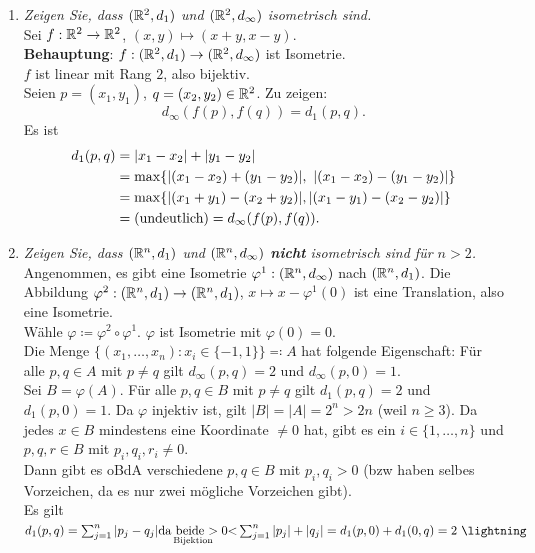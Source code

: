 \begin{problem*}[4]
  \begin{enumerate}
    \item \emph{Zeigen Sie, dass $ (\mathbb{R}^2, d_1) $ und $ (\mathbb{R}^2, d_\infty) $ isometrisch sind.} \\
      Sei $ f : \mathbb{R}^2 \to \mathbb{R}^2 $, $ (x,y) \mapsto (x+y, x-y) $. \\
      \textbf{Behauptung}: $ f : (\mathbb{R}^2, d_1) \to (\mathbb{R}^2, d_\infty) $ ist Isometrie. \\
      $ f $ ist linear mit Rang $ 2 $, also bijektiv. \\
      Seien $ p = (x_1, y_1) $, $ q = (x_2, y_2) \in \mathbb{R}^2 $. Zu zeigen:
      \begin{equation*}
        d_\infty(f(p),f(q)) = d_1(p,q)\text{.}
      \end{equation*}
      Es ist
      \begin{align*}
        d_1(p,q) &= \vert x_1 - x_2 \vert + \vert y_1 - y_2 \vert \\
          &= \max\{ \vert (x_1-x_2) + (y_1-y_2) \vert, \ \vert (x_1 - x_2) - (y_1-y_2) \vert \} \\
          &= \max\{ \vert (x_1 + y_1) - (x_2+y_2) \vert, \vert (x_1-y_1)-(x_2-y_2) \vert \} \\
          &= \text{(undeutlich)} = d_\infty(f(p),f(q))\text{.} \quad \qed
      \end{align*}
    \item \emph{Zeigen Sie, dass $ (\mathbb{R}^n, d_1) $ und $ (\mathbb{R}^n, d_\infty) $ \textbf{nicht} isometrisch sind für $ n > 2 $.} \\
    Angenommen, es gibt eine Isometrie $ \varphi^1: (\mathbb{R}^n, d_\infty) $ nach $ (\mathbb{R}^n, d_1) $. Die Abbildung $ \varphi^2 : (\mathbb{R}^n, d_1) \to (\mathbb{R}^n, d_1) $, $ x \mapsto x - \varphi^1(0) $ ist eine Translation, also eine Isometrie. \\
    Wähle $ \varphi \coloneqq \varphi^2 \circ \varphi^1 $. $ \varphi $ ist Isometrie mit $ \varphi(0) = 0 $. \\
    Die Menge $ \{ (x_1, \dots, x_n) : x_i \in \{ -1, 1 \} \} \eqqcolon A $ hat folgende Eigenschaft: Für alle $ p, q \in A $ mit $ p \neq q $ gilt $ d_\infty(p,q) = 2 $ und $ d_\infty(p, 0) = 1 $. \\
    Sei $ B = \varphi(A) $. Für alle $ p,q \in B $ mit $ p \neq q $ gilt $ d_1(p,q) = 2 $ und $ d_1(p,0) = 1 $. Da $ \varphi $ injektiv ist, gilt $ \vert B \vert = \vert A \vert = 2^n > 2n $ (weil $ n \geq 3 $). Da jedes $ x \in B $ mindestens eine Koordinate $ \neq 0 $ hat, gibt es ein $ i \in \{ 1, \dots, n \} $ und $ p,q,r \in B $ mit $ p_i, q_i, r_i \neq 0 $. \\
    Dann gibt es oBdA verschiedene $ p,q \in B $ mit $ p_i, q_i > 0 $ (bzw haben selbes Vorzeichen, da es nur zwei mögliche Vorzeichen gibt). \\
    Es gilt $ d_1(p,q) = \sum_{j = 1}^n \vert p_j - q_j \vert \underset{\text{Bijektion}}{\text{da beide $ > 0 $}}{<} \sum_{j = 1}^n \vert p_j \vert + \vert q_j \vert = d_1(p,0) + d_1(0,q) = 2 \ \lightning $
  \end{enumerate}
\end{problem*}

